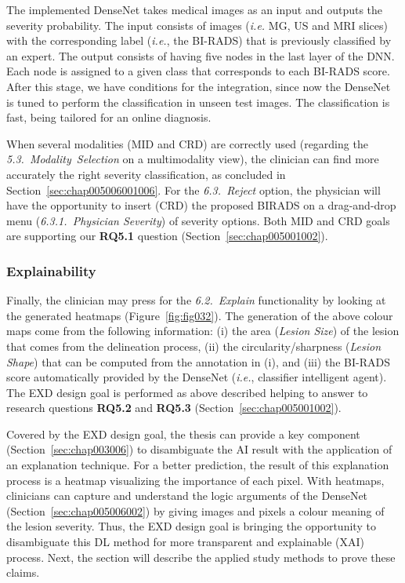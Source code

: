 The implemented DenseNet takes medical images as an input and outputs the severity probability.
The input consists of images ({\it i.e.} \ac{MG}, \ac{US} and \ac{MRI} slices) with the corresponding label ({\it i.e.}, the \ac{BI-RADS}) that is previously classified by an expert.
The output consists of having five nodes in the last layer of the \ac{DNN}.
Each node is assigned to a given class that corresponds to each \ac{BI-RADS} score.
After this stage, we have conditions for the integration, since now the DenseNet is tuned to perform the classification in unseen test images.
The classification is fast, being tailored for an online diagnosis.

When several modalities (\ac{MID} and \ac{CRD}) are correctly used (regarding the {\it 5.3.~Modality~Selection} on a multimodality view), the clinician can find more accurately the right severity classification, as concluded in Section~\ref{sec:chap005006001006}.
For the {\it 6.3.~Reject} option, the physician will have the opportunity to insert (\ac{CRD}) the proposed BIRADS on a drag-and-drop menu ({\it 6.3.1.~Physician Severity}) of severity options. Both \ac{MID} and \ac{CRD} goals are supporting our {\bf RQ5.1} question (Section~\ref{sec:chap005001002}).

\subsubsection{Explainability}
\label{sec:chap005004002002}

Finally, the clinician may press for the {\it 6.2.~Explain} functionality  by looking at the generated heatmaps (Figure~\ref{fig:fig032}).
The generation of the above colour maps come from the following information: (i) the area ({\it Lesion Size}) of the lesion that comes from the delineation process, (ii) the circularity/sharpness ({\it Lesion Shape}) that can be computed from the annotation in (i), and (iii) the BI-RADS score automatically provided by the DenseNet ({\it i.e.}, classifier intelligent agent).
The \ac{EXD} design goal is performed as above described helping to answer to research questions {\bf RQ5.2} and {\bf RQ5.3} (Section~\ref{sec:chap005001002}).

Covered by the \ac{EXD} design goal, the thesis can provide a key component (Section~\ref{sec:chap003006}) to disambiguate the \ac{AI} result with the application of an explanation technique.
For a better prediction, the result of this explanation process is a heatmap visualizing the importance of each pixel.
With heatmaps, clinicians can capture and understand the logic arguments of the DenseNet (Section~\ref{sec:chap005006002}) by giving images and pixels a colour meaning of the lesion severity.
Thus, the \ac{EXD} design goal is bringing the opportunity to disambiguate this \ac{DL} method for more transparent and explainable (\ac{XAI}) process.
Next, the section will describe the applied study methods to prove these claims.


